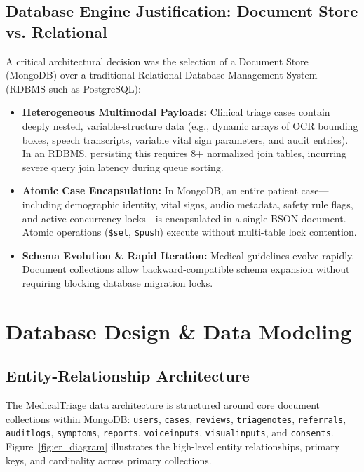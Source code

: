 \documentclass[11pt,a4paper,oneside]{report}
\begin{document}
\section{Database Engine Justification: Document Store vs. Relational}
A critical architectural decision was the selection of a Document Store (MongoDB) over a traditional Relational Database Management System (RDBMS such as PostgreSQL):
\begin{itemize}[leftmargin=20pt]
  \item \textbf{Heterogeneous Multimodal Payloads:} Clinical triage cases contain deeply nested, variable-structure data (e.g., dynamic arrays of OCR bounding boxes, speech transcripts, variable vital sign parameters, and audit entries). In an RDBMS, persisting this requires 8+ normalized join tables, incurring severe query join latency during queue sorting.
  \item \textbf{Atomic Case Encapsulation:} In MongoDB, an entire patient case---including demographic identity, vital signs, audio metadata, safety rule flags, and active concurrency locks---is encapsulated in a single BSON document. Atomic operations (\texttt{\$set}, \texttt{\$push}) execute without multi-table lock contention.
  \item \textbf{Schema Evolution \& Rapid Iteration:} Medical guidelines evolve rapidly. Document collections allow backward-compatible schema expansion without requiring blocking database migration locks.
\end{itemize}

\chapter{Database Design \& Data Modeling}

\section{Entity-Relationship Architecture}
The MedicalTriage data architecture is structured around core document collections within MongoDB: \texttt{users}, \texttt{cases}, \texttt{reviews}, \texttt{triagenotes}, \texttt{referrals}, \texttt{auditlogs}, \texttt{symptoms}, \texttt{reports}, \texttt{voiceinputs}, \texttt{visualinputs}, and \texttt{consents}.
Figure~\ref{fig:er_diagram} illustrates the high-level entity relationships, primary keys, and cardinality across primary collections.
\end{document}
